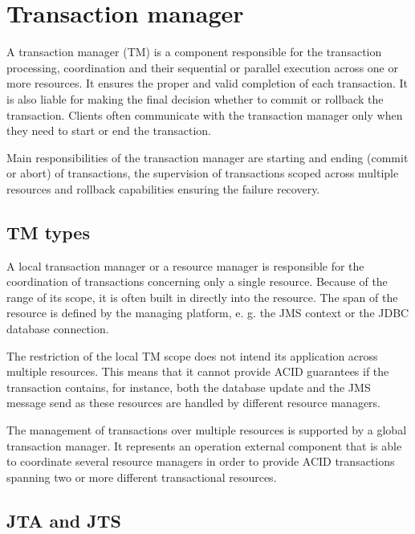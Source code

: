 \documentclass[oneside,
  digital, %
  table,   %
  nolof,     %
  nolot,     %
]{fithesis3}
\begin{document}
\section{Transaction manager}
\label{sec:transaction-manager}

A transaction manager (TM) is a component responsible for the transaction processing, coordination and their sequential or parallel execution across one or more resources. It ensures the proper and valid completion of each transaction. It is also liable for making the final decision whether to commit or rollback the transaction. Clients often communicate with the transaction manager only when they need to start or end the transaction.

Main responsibilities of the transaction manager are starting and ending (commit or abort) of transactions, the supervision of transactions scoped across multiple resources and rollback capabilities ensuring the failure recovery. 


\subsection{TM types}

A local transaction manager or a resource manager is responsible for the coordination of transactions concerning only a single resource. Because of the range of its scope, it is often built in directly into the resource. The span of the resource is defined by the managing platform, e. g. the JMS context or the JDBC database connection.  

The restriction of the local TM scope does not intend its application across multiple resources. This means that it cannot provide ACID guarantees if the transaction contains, for instance, both the database update and the JMS message send as these resources are handled by different resource managers.

The management of transactions over multiple resources is supported by a global transaction manager. It represents an operation external component that is able to coordinate several resource managers in order to provide ACID transactions spanning two or more different transactional resources.

\subsection{JTA and JTS}
\end{document}
